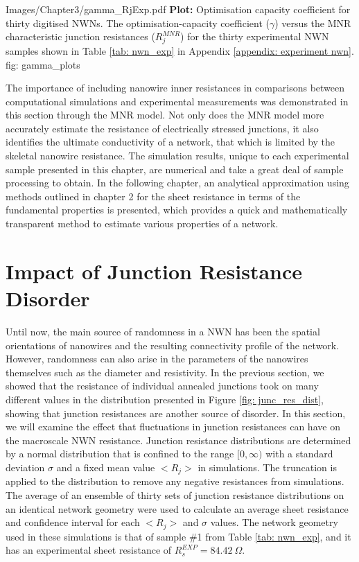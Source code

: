 {Images/Chapter3/gamma_RjExp.pdf}
{\textbf{Plot:} Optimisation capacity coefficient for thirty digitised NWNs.}
{The optimisation-capacity coefficient ($\gamma$) versus the MNR characteristic junction resistances ($R_j^{MNR}$) for the thirty experimental NWN samples shown in Table \ref{tab: nwn_exp} in Appendix \ref{appendix: experiment nwn}\cite{rocha2015}.}
{fig: gamma_plots}

The importance of including nanowire inner resistances in comparisons between computational simulations and experimental measurements was demonstrated in this section through the MNR model. Not only does the MNR model more accurately estimate the resistance of electrically stressed junctions, it also identifies the ultimate conductivity of a network, that which is limited by the skeletal nanowire resistance. The simulation results, unique to each experimental sample presented in this chapter, are numerical and take a great deal of sample processing to obtain. In the following chapter, an analytical approximation using methods outlined in chapter 2 for the sheet resistance in terms of the fundamental properties is presented, which provides a quick and mathematically transparent method to estimate various properties of a network.

\section{Impact of Junction Resistance Disorder}
\label{Sec: Dispersion}
Until now, the main source of randomness in a NWN has been the spatial orientations of nanowires and the resulting connectivity profile of the network. However, randomness can also arise in the parameters of the nanowires themselves such as the diameter and resistivity\cite{rocha2015}. In the previous section, we showed that the resistance of individual annealed junctions took on many different values in the distribution presented in Figure \ref{fig: junc_res_dist}, showing that junction resistances are another source of disorder. In this section, we will examine the effect that fluctuations in junction resistances can have on the macroscale NWN resistance. Junction resistance distributions are determined by a normal distribution that is confined to the range $[0,\infty)$ with a standard deviation $\sigma$ and a fixed mean value $<R_j>$ in simulations. The truncation is applied to the distribution to remove any negative resistances from simulations. The average of an ensemble of thirty sets of junction resistance distributions on an identical network geometry were used to calculate an average sheet resistance and confidence interval for each $<R_j>$ and $\sigma$ values. The network geometry used in these simulations is that of sample \#1 from Table \ref{tab: nwn_exp}, and it has an experimental sheet resistance of $R_s^{EXP} = 84.42~\Omega$. 

